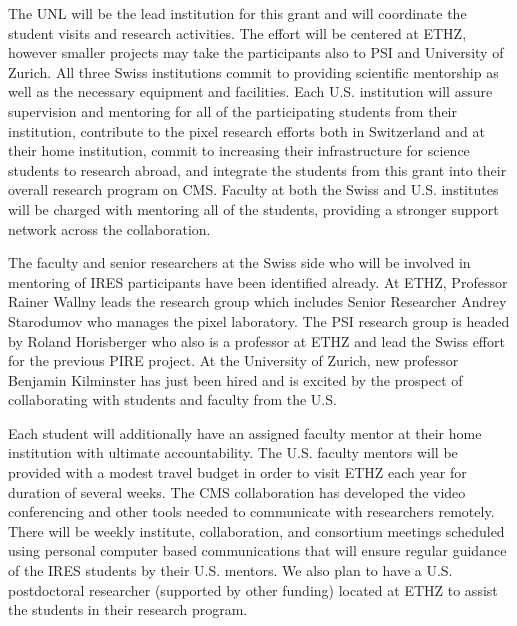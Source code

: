 %
The UNL will be the lead institution for this grant and will
coordinate the student visits and research activities. The effort will
be centered at ETHZ, however smaller projects may take the
participants also to PSI and University of Zurich. All three Swiss
institutions commit to providing scientific mentorship as well as the
necessary equipment and facilities.  Each U.S. institution will assure
supervision and mentoring for all of the participating students from
their institution, contribute to the pixel research efforts both in
Switzerland and at their home institution, commit to increasing their
infrastructure for science students to research abroad, and integrate
the students from this grant into their overall research program on
CMS.  Faculty at both the Swiss and U.S. institutes will be charged with
mentoring all of the students, providing a stronger support network
across the collaboration.

The faculty and senior researchers at the Swiss side who will be
involved in mentoring of IRES participants have been identified
already.  At ETHZ, Professor Rainer Wallny leads the research group
which includes Senior Researcher Andrey Starodumov who manages the
pixel laboratory.  The PSI research group is headed by Roland
Horisberger who also is a professor at ETHZ and lead the Swiss effort
for the previous PIRE project.  At the University of Zurich, new
professor Benjamin Kilminster has just been hired and is excited by
the prospect of collaborating with students and faculty from the U.S.

Each student will additionally have an assigned faculty mentor at
their home institution with ultimate accountability. The U.S. faculty
mentors will be provided with a modest travel budget in order to visit
ETHZ each year for duration of several weeks.  The CMS collaboration
has developed the video conferencing and other tools needed to
communicate with researchers remotely.  There will be weekly
institute, collaboration, and consortium meetings scheduled using
personal computer based communications that will ensure regular
guidance of the IRES students by their U.S. mentors. We also plan
to have a U.S. postdoctoral researcher (supported by other funding)
located at ETHZ to assist the students in their research program.

